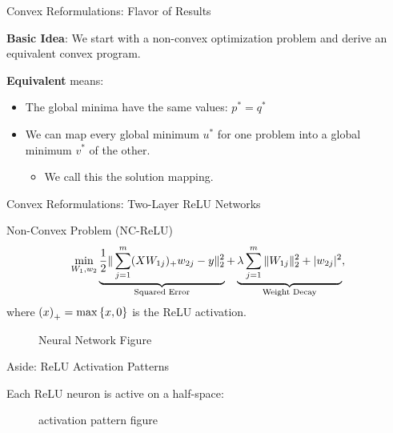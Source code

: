 \documentclass[usenames,dvipsnames,mathserif,notheorems]{beamer}
\newcommand{\bad}[1]{\textcolor{bad}{#1}}
\newcommand{\good}[1]{\textcolor{good}{#1}}
\def\showtikz{}
\begin{document}
\begin{frame}{Convex Reformulations: Flavor of Results}
	\large

	\textbf{Basic Idea}: We start with a \bad{non-convex} optimization problem and derive
	an equivalent \good{convex} program.

	\pause
	\vspace{2em}

	\textbf{Equivalent} means:
	\vspace{0.5em}
	\begin{itemize}
		\item The global minima have the same values: \( p^* = q^* \)
		      \vspace{0.5em}
		\item We can map every global minimum \( u^* \) for one problem into
		      a global minimum \( v^* \) of the other.
		      \vspace{0.5em}

		      \begin{itemize}
			      \item We call this the \good{solution mapping}.
		      \end{itemize}
	\end{itemize}

\end{frame}


\begin{frame}{Convex Reformulations: Two-Layer ReLU Networks}

	{\large \bad{Non-Convex Problem} (NC-ReLU)}
	\[
		\min_{W_1, w_2} \underbrace{\frac 1 2 \|\sum_{j=1}^m (X W_{1j})_+ w_{2j} - y\|_2^2}_{\text{Squared Error}}
		+ \underbrace{\lambda \sum_{j=1}^m \|W_{1j}\|_2^2 + |w_{2j}|^2}_{\text{Weight Decay}},
	\]
	where \( \left(x\right)_+ = \max\left\{x, 0\right\} \) is the ReLU activation.
	\pause

	\begin{figure}[]
		\centering
		\ifdefined\showtikz
			
		\else
			\Huge Neural Network Figure
		\fi
	\end{figure}

\end{frame}


\begin{frame}{Aside: ReLU Activation Patterns}

	Each ReLU neuron is active on a half-space:

	\pause

	\begin{figure}[]
		\centering
		\ifdefined\showtikz
			
		\else
			\Huge activation pattern figure
		\fi
	\end{figure}


\end{frame}
\end{document}
